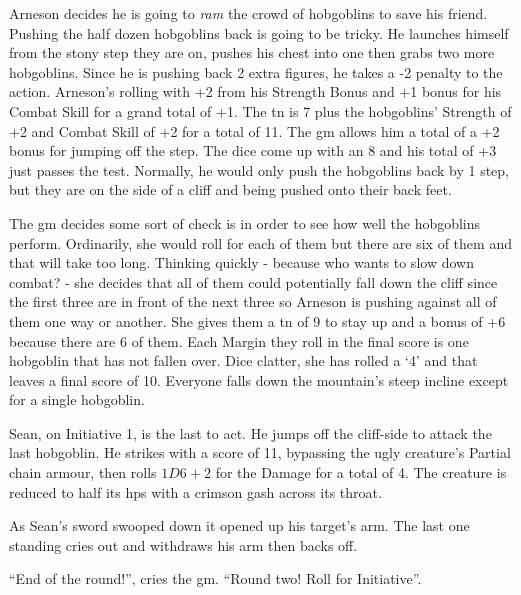 \begin{exampletext}

  Arneson decides he is going to \textit{ram} the crowd of hobgoblins to save his friend.
  Pushing the half dozen hobgoblins back is going to be tricky.
  He launches himself from the stony step they are on, pushes his chest into one then grabs two more hobgoblins.
  Since he is pushing back 2 extra figures, he takes a -2 penalty to the action.
  Arneson's rolling with +2 from his Strength Bonus and +1 bonus for his Combat Skill for a grand total of +1.
  The \gls{tn} is 7 plus the hobgoblins' Strength of +2 and Combat Skill of +2 for a total of 11.
  The \gls{gm} allows him a total of a +2 bonus for jumping off the step.
  The dice come up with an 8 and his total of +3 just passes the test.
  Normally, he would only push the hobgoblins back by 1 step, but they are on the side of a cliff and being pushed onto their back feet.

  The \gls{gm} decides some sort of check is in order to see how well the hobgoblins perform.
  Ordinarily, she would roll for each of them but there are six of them and that will take too long.
  Thinking quickly - because who wants to slow down combat? - she decides that all of them could potentially fall down the cliff since the first three are in front of the next three so Arneson is pushing against all of them one way or another.
  She gives them a \gls{tn} of 9 to stay up and a bonus of +6 because there are 6 of them.
  Each Margin they roll in the final score is one hobgoblin that has not fallen over.
  Dice clatter, she has rolled a `4' and that leaves a final score of 10.
  Everyone falls down the mountain's steep incline except for a single hobgoblin.

  Sean, on Initiative 1, is the last to act.
  He jumps off the cliff-side to attack the last hobgoblin.
  He strikes with a score of 11, bypassing the ugly creature's Partial chain armour, then rolls $1D6+2$ for the Damage for a total of 4.
  The creature is reduced to half its \glspl{hp} with a crimson gash across its throat.

  As Sean's sword swooped down it opened up his target's arm. The last one standing cries out and withdraws his arm then backs off.

  ``End of the \gls{round}!'', cries the \gls{gm}. ``Round two! Roll for Initiative''.
\end{exampletext}

